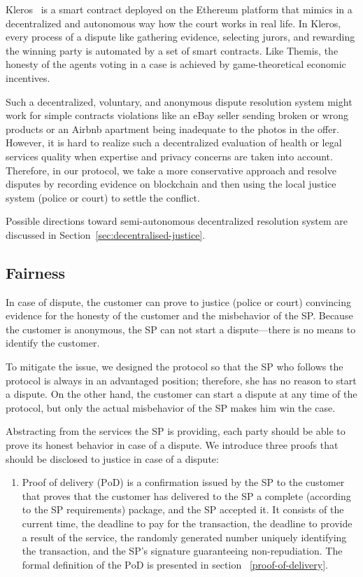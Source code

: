 \documentclass[pdftex,twocolumn,epjc3]{svjour3}
\begin{document}
{Kleros~\cite{bergollaKlerosSociolegalCase2022} is a smart contract deployed on the Ethereum platform that mimics in a decentralized and autonomous way how the court works in real life. In Kleros, every process of a dispute like gathering evidence, selecting jurors, and rewarding the winning party is automated by a set of smart contracts. Like Themis, the honesty of the agents voting in a case is achieved by game-theoretical economic incentives.

Such a decentralized, voluntary, and anonymous dispute resolution system might work for simple contracts violations like an eBay seller sending broken or wrong products or an Airbnb apartment being inadequate to the photos in the offer. However, it is hard to realize such a decentralized evaluation of health or legal services quality when expertise and privacy concerns are taken into account. Therefore, in our protocol, we take a more conservative approach and resolve disputes by recording evidence on blockchain and then using the local justice system (police or court) to settle the conflict.

Possible directions toward semi-autonomous decentralized resolution system are discussed in Section~\ref{sec:decentralised-justice}.

\subsection{Fairness}\label{fairness}

In case of dispute, the customer can prove to justice (police or court) convincing evidence for the honesty of the customer and the misbehavior of the SP. 
Because the customer is anonymous, the SP can not start a dispute---there is no means to identify the customer.

To mitigate the issue, we designed the protocol so that the SP who follows the protocol is always in an advantaged position; therefore, she has no reason to start a dispute. On the other hand, the customer can start a dispute at any time of the protocol, but only the actual misbehavior of the SP makes him win the case.

Abstracting from the services the SP is providing, each party should be able to prove its honest behavior in case of a dispute. We introduce three proofs that should be disclosed to justice in case of a dispute:

\begin{enumerate}
    \item Proof of delivery ($\mathrm{PoD}$) is a confirmation issued by the SP to the customer that proves that the customer has delivered to the SP a complete (according to the SP requirements) package, and the SP accepted it. It consists of the current time, the deadline to pay for the transaction, the deadline to provide a result of the service, the randomly generated number uniquely identifying the transaction, and the SP's signature guaranteeing non-repudiation. The formal definition of the $\mathrm{PoD}$ is presented in section ~\ref{proof-of-delivery}.
    

\end{enumerate}}
\end{document}
